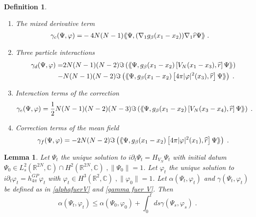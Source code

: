 \documentclass[11pt, english, american]{article}
\newcommand{\laa}{\langle\hspace{-0.08cm}\langle}
\newcommand{\raa}{\rangle\hspace{-0.08cm}\rangle}
\newtheorem{lemma}[theorem]{Lemma}
\newtheorem{definition}[theorem] {Definition}
\renewcommand{\phi}{\varphi}
\newcommand{\bs}{\gamma_c}
\newcommand{\cs}{\gamma_d}
\newcommand{\ds}{\gamma_e}
\begin{document}
\begin{definition}
\begin{enumerate}
 \item [(c)] The mixed derivative term
\begin{align*} \bs (\Psi,\phi)=&-4N(N-1)\laa\Psi
, (\nabla_1g_{\beta}(x_1-x_2))\nabla_1
\widehat{r}\Psi\raa\;.\end{align*}
\item [(d)] Three particle interactions
\begin{align*}\cs (\Psi,\phi)=&2N(N-1)(N-2)\Im\left(\laa\Psi ,g_{\beta}(x_{1}-x_{2})
\left[V_N(x_1-x_3),
\widehat{r}\right] \Psi\raa\right)
%
\\-&N(N-1)(N-2)\Im\left(\laa\Psi ,g_{\beta}(x_{1}-x_{2})
\left[4 \pi |\phi|^2(x_3),
\widehat{r}\right] \Psi\raa\right)\;.\end{align*}
\item [(e)] Interaction terms of the correction
\begin{align*}&\ds (\Psi,\phi)=\frac{1}{2}N(N-1)(N-2)(N-3)%
\Im\left(\laa\Psi ,
g_{\beta}(x_{1}-x_{2})\left[V_N(x_3-x_4),
\widehat{r}\right] \Psi\raa\right)\;.
\end{align*}
\item[(f)] Correction terms of the mean field
\begin{align*}
\gamma_f(\Psi,\phi)=
-2N (N-2)\Im\left(\laa\Psi,g_{\beta}(x_{1}-x_{2})
\left[4 \pi |\phi|^2(x_1),
\widehat{r}\right] \Psi\raa\right)
\;.
\end{align*}
\end{enumerate}
\end{definition}


\begin{lemma}\label{secondadjlemma}
Let $\Psi_t$ the unique solution to $i \partial_t \Psi_t
= H_{V_N} \Psi_t$ with initial datum $\Psi_0 \in L^2_{s}(\mathbb{R}^{2N}, \mathbb{C}) \cap H^2(\mathbb{R}^{2N}, \mathbb{C}) \;, 
\|\Psi_0\|=1$. 
Let $\phi_t$ the unique solution to $i \partial_t \phi_t
= h^{GP}_{4 \pi} \phi_t$ with $\phi_t \in H^3(\mathbb{R}^2,\mathbb{C}) \;,\|\phi_0\|=1$.
Let $\alpha(\Psi_t,\phi_t)$ and $\gamma(\Psi_t,\phi_t)$ be defined as in \eqref{alphafuerV} and \eqref{gamma fuer V}. Then
$$\alpha(\Psi_t,\phi_t)\leq 
\alpha(\Psi_0,\phi_0)
+
\int_0^t ds
\gamma(\Psi_s,\phi_s) \;.$$
\end{lemma}
\end{document}
